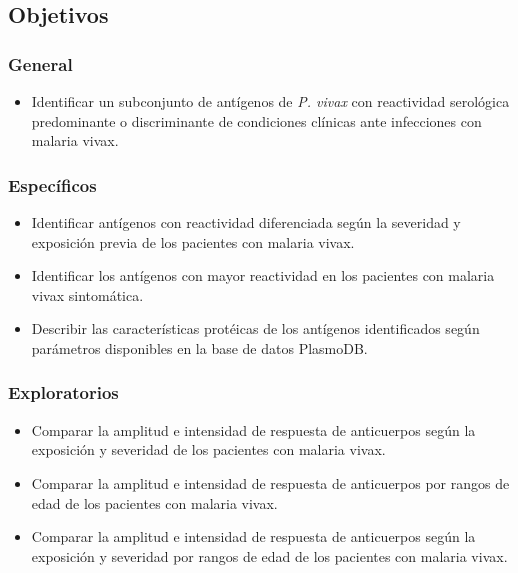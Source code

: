 \documentclass[]{article}
\providecommand{\tightlist}{%
  \setlength{\itemsep}{0pt}\setlength{\parskip}{0pt}}
\begin{document}
\subsection{Objetivos}\label{objetivos}

\subsubsection{General}\label{general}

\begin{itemize}
\tightlist
\item
  Identificar un subconjunto de antígenos de \emph{P. vivax} con
  reactividad serológica predominante o discriminante de condiciones
  clínicas ante infecciones con malaria vivax.
\end{itemize}

\subsubsection{Específicos}\label{especificos}

\begin{itemize}
\item
  Identificar antígenos con reactividad diferenciada según la severidad
  y exposición previa de los pacientes con malaria vivax.
\item
  Identificar los antígenos con mayor reactividad en los pacientes con
  malaria vivax sintomática.
\item
  Describir las características protéicas de los antígenos identificados
  según parámetros disponibles en la base de datos PlasmoDB.
\end{itemize}

\subsubsection{Exploratorios}\label{exploratorios}

\begin{itemize}
\item
  Comparar la amplitud e intensidad de respuesta de anticuerpos según la
  exposición y severidad de los pacientes con malaria vivax.
\item
  Comparar la amplitud e intensidad de respuesta de anticuerpos por
  rangos de edad de los pacientes con malaria vivax.
\item
  Comparar la amplitud e intensidad de respuesta de anticuerpos según la
  exposición y severidad por rangos de edad de los pacientes con malaria
  vivax.
\end{itemize}
\end{document}
